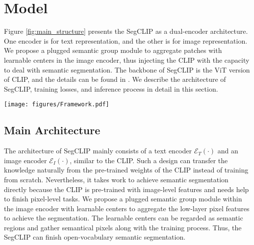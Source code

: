 \documentclass{article}
\theoremstyle{plain}
\theoremstyle{definition}
\theoremstyle{remark}
\begin{document}
\section{Model}
\label{sec_model}
Figure \ref{fig:main_structure} presents the SegCLIP as a dual-encoder architecture. One encoder is for text representation, and the other is for image representation. We propose a plugged semantic group module to aggregate patches with learnable centers in the image encoder, thus injecting the CLIP with the capacity to deal with semantic segmentation. The backbone of SegCLIP is the ViT version of CLIP, and the details can be found in \cite{Radford2021Learning}. We describe the architecture of SegCLIP, training losses, and inference process in detail in this section.
\begin{figure*}[htbp] 
    \centering
    \texttt{[image: figures/Framework.pdf]}
    \caption{\textbf{The framework of SegCLIP}. The SegCLIP is a dual-encoder architecture containing a text and image encoder. The semantic group module (zoom in at the right) is proposed to generate regular patches to arbitrary-shaped semantic regions. Three losses, including contrastive loss, reconstruction loss, and superpixel-based KL loss, are used in training.}
    \label{fig:main_structure}
\end{figure*}

\subsection{Main Architecture}
The architecture of SegCLIP mainly consists of a text encoder $\mathcal{E}_T(\cdot)$ and an image encoder $\mathcal{E}_I(\cdot)$, similar to the CLIP. Such a design can transfer the knowledge naturally from the pre-trained weights of the CLIP instead of training from scratch. Nevertheless, it takes work to achieve semantic segmentation directly because the CLIP is pre-trained with image-level features and needs help to finish pixel-level tasks. We propose a plugged semantic group module within the image encoder with learnable centers to aggregate the low-layer pixel features to achieve the segmentation. The learnable centers can be regarded as semantic regions and gather semantical pixels along with the training process. Thus, the SegCLIP can finish open-vocabulary semantic segmentation.
\end{document}
